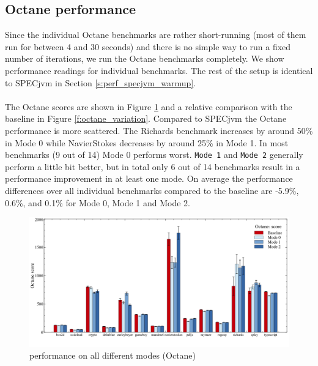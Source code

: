 \subsection{Octane performance}
\label{s:perf_octane}
Since the individual Octane benchmarks are rather short-running (most of them run for between 4 and 30 seconds) and there is no simple way to run a fixed number of iterations, we run the Octane benchmarks completely. We show performance readings for individual benchmarks. The rest of the setup is identical to SPECjvm in Section \ref{s:perf_specjvm_warmup}.
\\\\
The Octane scores are shown in Figure \ref{f:octane} and a relative comparison with the baseline in Figure \ref{f:octane_variation}.
Compared to SPECjvm the Octane performance is more scattered. The Richards benchmark increases by around 50\% in Mode 0 while NavierStokes decreases by around 25\% in Mode 1. In most benchmarks (9 out of 14) Mode 0 performs worst.
\texttt{Mode 1} and \texttt{Mode 2} generally perform a little bit better, but in total only 6 out of 14 benchmarks result in a performance improvement in at least one mode.
On average the performance differences over all individual benchmarks compared to the baseline are -5.9\%, 0.6\%, and 0.1\% for Mode 0, Mode 1 and Mode 2.
\begin{figure}[ht]
  \begin{center}
    \centering
    \includegraphics[width=1.0\textwidth]{figures/octane.png}
    \caption{performance on all different modes (Octane)}
    \label{f:octane}
  \end{center}
\end{figure}

